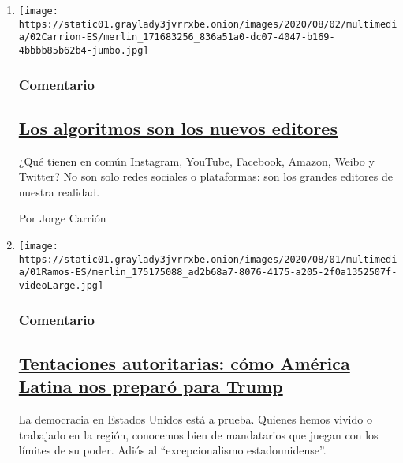 \begin{enumerate}
\def\labelenumi{\arabic{enumi}.}
\item
  \texttt{[image: https://static01.graylady3jvrrxbe.onion/images/2020/08/02/multimedia/02Carrion-ES/merlin\_171683256\_836a51a0-dc07-4047-b169-4bbbb85b62b4-jumbo.jpg]}

  \hypertarget{comentario}{%
  \subsubsection{Comentario}\label{comentario}}

  \hypertarget{los-algoritmos-son-los-nuevos-editores}{%
  \subsection{\texorpdfstring{\href{/es/2020/08/02/espanol/opinion/facebook-amazon-instagram.html}{Los
  algoritmos son los nuevos
  editores}}{Los algoritmos son los nuevos editores}}\label{los-algoritmos-son-los-nuevos-editores}}

  ¿Qué tienen en común Instagram, YouTube, Facebook, Amazon, Weibo y
  Twitter? No son solo redes sociales o plataformas: son los grandes
  editores de nuestra realidad.

  Por Jorge Carrión
\item
  \texttt{[image: https://static01.graylady3jvrrxbe.onion/images/2020/08/01/multimedia/01Ramos-ES/merlin\_175175088\_ad2b68a7-8076-4175-a205-2f0a1352507f-videoLarge.jpg]}

  \hypertarget{comentario-1}{%
  \subsubsection{Comentario}\label{comentario-1}}

  \hypertarget{tentaciones-autoritarias-cuxf3mo-amuxe9rica-latina-nos-preparuxf3-para-trump}{%
  \subsection{\texorpdfstring{\href{/es/2020/08/01/espanol/opinion/trump-autoritarismo.html}{Tentaciones
  autoritarias: cómo América Latina nos preparó para
  Trump}}{Tentaciones autoritarias: cómo América Latina nos preparó para Trump}}\label{tentaciones-autoritarias-cuxf3mo-amuxe9rica-latina-nos-preparuxf3-para-trump}}

  La democracia en Estados Unidos está a prueba. Quienes hemos vivido o
  trabajado en la región, conocemos bien de mandatarios que juegan con
  los límites de su poder. Adiós al ``excepcionalismo estadounidense''.


\end{enumerate}
